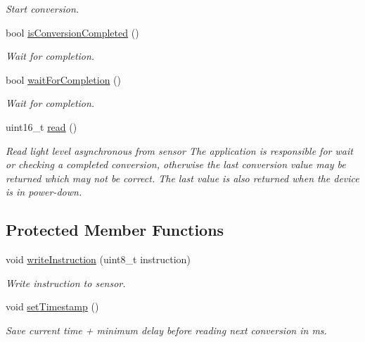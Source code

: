 \begin{DoxyCompactItemize}
\begin{DoxyCompactList}\small\item\em Start conversion. \end{DoxyCompactList}\item 
bool \hyperlink{class_b_h1750_a97ec98f0a977395e8b1abf38603ff729}{is\+Conversion\+Completed} ()
\begin{DoxyCompactList}\small\item\em Wait for completion. \end{DoxyCompactList}\item 
bool \hyperlink{class_b_h1750_a11f03719a00c091f83e8b8390157a3d6}{wait\+For\+Completion} ()
\begin{DoxyCompactList}\small\item\em Wait for completion. \end{DoxyCompactList}\item 
uint16\+\_\+t \hyperlink{class_b_h1750_a80427aaebb649831d0373eebb9687be4}{read} ()
\begin{DoxyCompactList}\small\item\em Read light level asynchronous from sensor The application is responsible for wait or checking a completed conversion, otherwise the last conversion value may be returned which may not be correct. The last value is also returned when the device is in power-\/down. \end{DoxyCompactList}\end{DoxyCompactItemize}
\subsection*{Protected Member Functions}
\begin{DoxyCompactItemize}
\item 
void \hyperlink{class_b_h1750_aa1a6679e85a27dbe31793c8507a8d2ae}{write\+Instruction} (uint8\+\_\+t instruction)
\begin{DoxyCompactList}\small\item\em Write instruction to sensor. \end{DoxyCompactList}\item 
void \hyperlink{class_b_h1750_a0757c8a33ec1ba56e9b2ba8d79c1ff50}{set\+Timestamp} ()\hypertarget{class_b_h1750_a0757c8a33ec1ba56e9b2ba8d79c1ff50}{}\label{class_b_h1750_a0757c8a33ec1ba56e9b2ba8d79c1ff50}

\begin{DoxyCompactList}\small\item\em Save current time + minimum delay before reading next conversion in ms. \end{DoxyCompactList}\end{DoxyCompactItemize}


